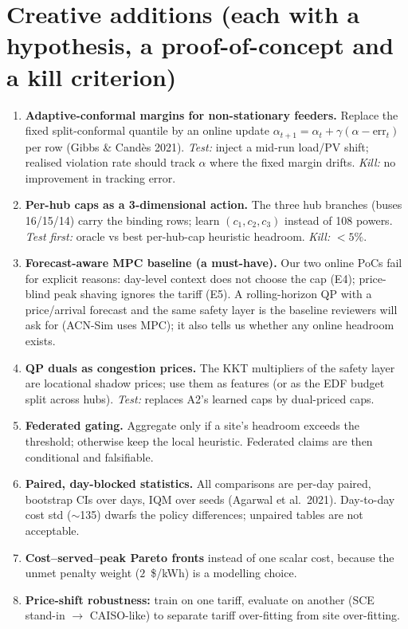 \documentclass[10pt,a4paper]{article}
\begin{document}
\section{Creative additions (each with a hypothesis, a proof-of-concept and a kill criterion)}
\begin{enumerate}[label=\textbf{A\arabic*.}]
\item \textbf{Adaptive-conformal margins for non-stationary feeders.} Replace the fixed split-conformal quantile by an online update
$\alpha_{t+1}=\alpha_t+\gamma(\alpha-\mathrm{err}_t)$ per row (Gibbs \& Cand\`es 2021). \emph{Test:} inject a mid-run load/PV shift;
realised violation rate should track $\alpha$ where the fixed margin drifts. \emph{Kill:} no improvement in tracking error.
\item \textbf{Per-hub caps as a 3-dimensional action.} The three hub branches (buses 16/15/14) carry the binding rows; learn $(c_1,c_2,c_3)$
instead of 108 powers. \emph{Test first:} oracle vs best per-hub-cap heuristic headroom. \emph{Kill:} $<5\%$.
\item \textbf{Forecast-aware MPC baseline (a must-have).} Our two online PoCs fail for explicit reasons: day-level context does not
choose the cap (E4); price-blind peak shaving ignores the tariff (E5). A rolling-horizon QP with a price/arrival forecast and the same safety layer
is the baseline reviewers will ask for (ACN-Sim uses MPC); it also tells us whether any online headroom exists.
\item \textbf{QP duals as congestion prices.} The KKT multipliers of the safety layer are locational shadow prices; use them as features
(or as the EDF budget split across hubs). \emph{Test:} replaces A2's learned caps by dual-priced caps.
\item \textbf{Federated gating.} Aggregate only if a site's headroom exceeds the threshold; otherwise keep the local heuristic. Federated
claims are then conditional and falsifiable.
\item \textbf{Paired, day-blocked statistics.} All comparisons are per-day paired, bootstrap CIs over days, IQM over seeds
(Agarwal et al.\ 2021). Day-to-day cost std ($\sim$135) dwarfs the policy differences; unpaired tables are not acceptable.
\item \textbf{Cost--served--peak Pareto fronts} instead of one scalar cost, because the unmet penalty weight ($2$~\$/kWh) is a modelling choice.
\item \textbf{Price-shift robustness:} train on one tariff, evaluate on another (SCE stand-in $\to$ CAISO-like) to separate tariff
over-fitting from site over-fitting.
\end{enumerate}
\end{document}
